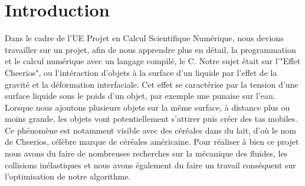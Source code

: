 \documentclass[a4paper, 11pt, oneside]{article} %
\begin{document}
 

\newpage
\section*{Introduction}

    Dans le cadre de l'UE Projet en Calcul Scientifique Numérique, nous devions travailler sur un projet, afin de nous apprendre plus en détail, la programmation et le calcul numérique avec un langage compilé, le C. Notre sujet était sur l'"Effet Cheerios", ou l’intéraction d'objets à la surface d'un liquide par l'effet de la gravité et la déformation interfaciale. Cet effet se caractérise par la tension d'une surface liquide sous le poids d'un objet, par exemple une punaise sur l'eau. Lorsque nous ajoutons plusieurs objets sur la même surface, à distance plus ou moins grande, les objets vont potentiellement s'attirer puis créer des tas mobiles. Ce phénomène est notamment visible avec des céréales dans du lait, d'où le nom de Cheerios, célèbre marque de céréales américaine. Pour réaliser à bien ce projet nous avons du faire de nombreuses recherches sur la mécanique des fluides, les collisions inélastiques et nous avons également du faire un travail conséquent sur l'optimisation de notre algorithme.
\end{document}
